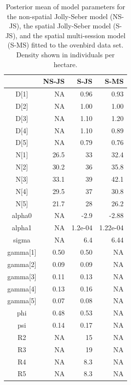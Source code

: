 \begin{table}
\centering
\caption{
Posterior mean of model parameters for the non-spatial Jolly-Seber 
model (NS-JS), the spatial Jolly-Seber model (S-JS),
and the spatial multi-session model (S-MS) fitted to the
ovenbird data set.  Density shown in individuals per hectare.
}

\begin{tabular}{crrr}
\hline \hline
    &   NS-JS &   S-JS   &   S-MS \\  \hline
D[1]    &  NA & 0.96 &  0.93   \\
D[2]     & NA & 1.00 &  1.00  \\
D[3]   &   NA & 1.10 &  1.20  \\
D[4]   &   NA & 1.10 &  0.89 \\
D[5]   &   NA & 0.79  & 0.76  \\
N[1]   &  26.5 &  33 &  32.4  \\
N[2]   &  30.2 &  36 &  35.8  \\
N[3]    & 33.1 &  39 &  42.1 \\
N[4]   &  29.5 &  37 &  30.8 \\
N[5]   &   21.7 & 28 &  26.2 \\
alpha0 &   NA & -2.9 & -2.88  \\
alpha1  &   NA & 1.2e-04 & 1.22e-04  \\
sigma  &   NA &  6.4 & 6.44 \\
gamma[1]  & 0.50 &  0.50 & NA \\
gamma[2] &  0.09  & 0.09 & NA \\
gamma[3] &  0.11 & 0.13 & NA \\
gamma[4] &  0.13 & 0.16 & NA \\
gamma[5] &  0.07 & 0.08 & NA \\
phi   &  0.48 &   0.53 & NA \\
psi   &  0.14 &  0.17 & NA \\
R2    &  NA &   15 & NA \\
R3    &   NA &   19 & NA \\
R4    &   NA &   8.3 & NA \\  %
R5    &   NA &   8.3 & NA \\ \hline
\end{tabular}
\label{open.tab.JSmulti}
\end{table}


